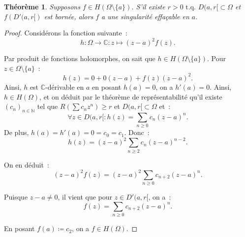 \documentclass{report}
\newtheorem{thm}{Théorème}[chapter]
\theoremstyle{definition}
\theoremstyle{remark}
\numberwithin{equation}{section}
\newcommand{\C}{\mathbb C}
\newcommand{\N}{\mathbb N}
\newcommand{\tq}{\text{ t.q. }}
\begin{document}
			\begin{thm} Supposons $f \in H(\Omega \setminus \{a\})$. S'il existe $r > 0 \tq D(a, r[ \subset \Omega$ et $f\left(D'(a, r[\right)$ est bornée, alors
			$f$ a une singularité effaçable en $a$.
			\end{thm}

			\begin{proof} Considérons la fonction suivante~:
			\begin{equation}
				h : \Omega \to \C : z \mapsto (z-a)^2f(z).
			\end{equation}

			Par produit de fonctions holomorphes, on sait que $h \in H(\Omega \setminus \{a\})$. Pour $z \in \Omega \setminus \{a\}$~:
			\begin{equation}
				h(z) = 0 + 0(z-a) + f(z)(z-a)^2.
			\end{equation}
			Ainsi, $h$ est $\C$-dérivable en $a$ en posant $h(a) = 0$, on a $h'(a) = 0$. Ainsi, $h \in H(\Omega)$, et on déduit par le théorème de
			représentabilité qu'il existe $(c_n)_{n \in \N}$ tel que $R(\sum c_nz^n) \geq r$ et $D(a, r[ \subset \Omega$ et~:
			\begin{equation}
				\forall z \in D(a, r[ : h(z) = \sum_{n \geq 0}c_n(z-a)^n.
			\end{equation}
			De plus, $h(a) = h'(a) = 0 = c_0 = c_1$. Donc~:
			\begin{equation}
				h(z) = (z-a)^2\sum_{n \geq 2}c_n(z-a)^{n-2}.
			\end{equation}

			On en déduit~:
			\begin{equation}
				(z-a)^2f(z) = (z-a)^2\sum_{n \geq 0}c_{n+2}(z-a)^n.
			\end{equation}

			Puisque $z-a \neq 0$, il vient que pour $z \in D'(a, r[$, on a~:
			\begin{equation}
				f(z) = \sum_{n \geq 0}c_{n+2}(z-a)^n.
			\end{equation}

			En posant $f(a) \coloneqq c_2$, on a $f \in H(\Omega)$.
			\end{proof}
\end{document}
